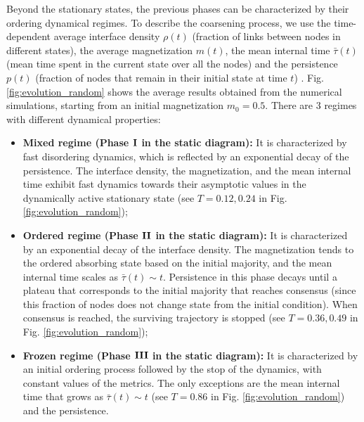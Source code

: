 Beyond the stationary states, the previous phases can be characterized by their ordering dynamical regimes. To describe the coarsening process, we use the time-dependent average interface density $\rho(t)$ (fraction of links between nodes in different states), the average magnetization $m(t)$, the mean internal time $\bar{\tau}(t)$ (mean time spent in the current state over all the nodes) and the persistence $p(t)$ (fraction of nodes that remain in their initial state at time $t$) \cite{ben-naim-1996}. Fig. \ref{fig:evolution_random} shows the average results obtained from the numerical simulations, starting from an initial magnetization $m_0 = 0.5$. There are 3 regimes with different dynamical properties:

\begin{itemize}
	\item \textbf{Mixed regime (Phase ${\rm {\bf I}}$ in the static diagram):} It is characterized by fast disordering dynamics, which is reflected by an exponential decay of the persistence. The interface density, the magnetization, and the mean internal time exhibit fast dynamics towards their asymptotic values in the dynamically active stationary state (see $T = 0.12, 0.24$ in Fig. \ref{fig:evolution_random});
	\item \textbf{Ordered regime (Phase ${\rm {\bf II}}$ in the static diagram):} It is characterized by an exponential decay of the interface density. The magnetization tends to the ordered absorbing state based on the initial majority, and the mean internal time scales as $\bar{\tau}(t) \sim t$. Persistence in this phase decays until a plateau that corresponds to the initial majority that reaches consensus (since this fraction of nodes does not change state from the initial condition). When consensus is reached, the surviving trajectory is stopped (see $T = 0.36, 0.49$ in Fig. \ref{fig:evolution_random});
	\item \textbf{Frozen regime (Phase ${\rm {\bf III}}$ in the static diagram):} It is characterized by an initial ordering process followed by the stop of the dynamics, with constant values of the metrics. The only exceptions are the mean internal time that grows as $\bar{\tau}(t) \sim t$ (see $T = 0.86$ in Fig. \ref{fig:evolution_random}) and the persistence.
\end{itemize}

